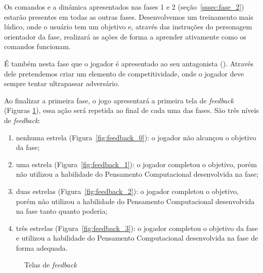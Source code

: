 

Os comandos e a dinâmica apresentados nas fases 1 e 2 (seção~\ref{sssec:fase_2}) estarão presentes em todas as outras fases. Desenvolvemos um treinamento mais lúdico, onde o usuário tem um objetivo e, através das instruções do personagem orientador da fase, realizará as ações de forma a aprender ativamente como os comandos funcionam.

É também nesta fase que o jogador é apresentado ao seu antagonista (). Através dele pretendemos criar um elemento de competitividade, onde o jogador deve sempre tentar ultrapassar adversário.


Ao finalizar a primeira fase, o jogo apresentará a primeira tela de \textit{feedback} (Figuras \ref{fig:feedbacks}), essa ação será repetida ao final de cada uma das fases. São três níveis de \textit{feedback}: 

\begin{enumerate}
	\item nenhuma estrela (Figura~\ref{fig:feedback_0}): o jogador não alcançou o objetivo da fase;
	\item uma estrela (Figura~\ref{fig:feedback_1}): o jogador completou o objetivo, porém não utilizou a habilidade do Pensamento Computacional desenvolvida na fase;
	\item duas estrelas (Figura~\ref{fig:feedback_2}): o jogador completou o objetivo, porém não utilizou a habilidade do Pensamento Computacional desenvolvida na fase tanto quanto poderia;
	\item três estrelas (Figura~\ref{fig:feedback_3}): o jogador completou o objetivo da fase e utilizou a habilidade do Pensamento Computacional desenvolvida na fase de forma adequada.
\end{enumerate}

\begin{figure}[H]
\centering
{}
\quad %
\quad %
\quad %
\caption{Telas de \textit{feedback}}
\label{fig:feedbacks}
\end{figure}

